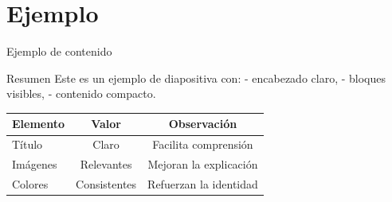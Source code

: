 \section{Ejemplo}

\begin{frame}{Ejemplo de contenido}
  \begin{block}{Resumen}
    Este es un ejemplo de diapositiva con:\n
    - encabezado claro,\n
    - bloques visibles,\n
    - contenido compacto.
  \end{block}

  \vspace{0.3cm}
  \begin{table}
    \centering
    \begin{tabular}{lcc}
      \toprule
      Elemento & Valor & Observación \\
      \midrule
      Título & Claro & Facilita comprensión \\
      Imágenes & Relevantes & Mejoran la explicación \\
      Colores & Consistentes & Refuerzan la identidad \\
      \bottomrule
    \end{tabular}
  \end{table}
\end{frame}
